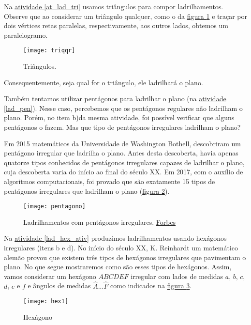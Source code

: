Na \hyperref[at_lad_tri]{atividade \ref{at_lad_tri}} usamos triângulos para compor ladrilhamentos. Observe que ao considerar um triângulo qualquer, como o da \hyperref[triqqr]{figura \ref{triqqr}} e traçar por dois vértices retas paralelas, respectivamente, aos outros lados, obtemos um paralelogramo. 

\begin{figure}[H]
\centering
\texttt{[image: triqqr]}
\caption{Triângulos.}
\label{triqqr}
\end{figure}

Consequentemente, seja qual for o triângulo, ele ladrilhará o plano.

Também tentamos utilizar pentágonos para ladrilhar o plano (na \hyperref[lad_pen]{atividade \ref{lad_pen}}). Nesse caso, percebemos que os pentágonos regulares não ladrilham o plano. Porém, no item b)da mesma atividade, foi possível verificar  que alguns pentágonos o fazem. Mas que tipo de pentágonos irregulares ladrilham o plano?

Em 2015 matemáticos da  Universidade de Washington Bothell, descobriram um pentágono irregular que ladrilha o plano. Antes desta descoberta, havia apenas quatorze tipos conhecidos de pentágonos irregulares capazes de ladrilhar o  plano, cuja descoberta varia do início ao final do século XX. Em 2017, com o auxílio de algoritmos computacionais, foi provado que são exatamente 15 tipos de pentágonos irregulares que ladrilham o plano (\hyperref[pentagono]{figura \ref{pentagono}}).

\begin{figure}[H]
\centering
\texttt{[image: pentagono]}
\caption{Ladrilhamentos com pentágonos irregulares. \href{encurtador.com.br/dmuE3}{Forbes}}
\label{pentagono}
\end{figure}



Na \hyperref[lad_hex_ativ]{atividade \ref{lad_hex_ativ}} produzimos ladrilhamentos usando hexágonos irregulares (itens b e d). No início do século XX, K. Reinhardt um matemático alemão provou que existem três tipos de hexágonos irregulares que pavimentam o plano. No que segue mostraremos como são esses tipos de hexágonos. Assim, vamos considerar um hexágono $ABCDEF$ irregular com lados de medidas $a$, $b$, $c$, $d$, $e$ e $f$ e ângulos de medidas $\hat{A}... \hat{F}$ como indicados na \hyperref[hex1]{figura \ref{hex1}}.

\begin{figure}[H]
\centering
\texttt{[image: hex1]}
\caption{Hexágono}
\label{hex1}
\end{figure}

